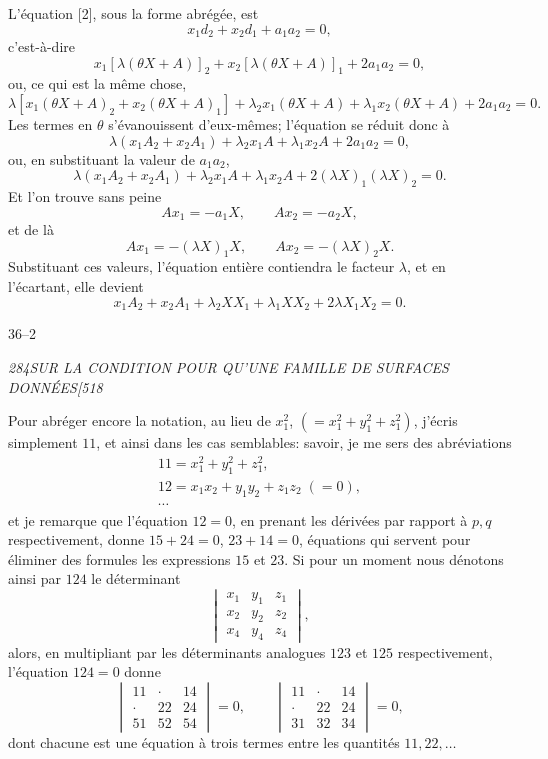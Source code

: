\documentclass[11pt]{article}
\newcommand{\phead}[3]{\noindent\textit{#1\hfill #2\hfill #3}\par\medskip}
\begin{document}
L'\'equation [2], sous la forme abr\'eg\'ee, est
\[
x_1d_2+x_2d_1+a_1a_2=0,
\]
c'est-\`a-dire
\[
x_1[\lambda(\theta X+A)]_2+x_2[\lambda(\theta X+A)]_1+2a_1a_2=0,
\]
ou, ce qui est la m\^eme chose,
\[
\lambda[x_1(\theta X+A)_2+x_2(\theta X+A)_1]
+\lambda_2x_1(\theta X+A)+\lambda_1x_2(\theta X+A)+2a_1a_2=0.
\]
Les termes en $\theta$ s'\'evanouissent d'eux-m\^emes; l'\'equation se r\'eduit donc \`a
\[
\lambda(x_1A_2+x_2A_1)+\lambda_2x_1A+\lambda_1x_2A+2a_1a_2=0,
\]
ou, en substituant la valeur de $a_1a_2$,
\[
\lambda(x_1A_2+x_2A_1)+\lambda_2x_1A+\lambda_1x_2A+2(\lambda X)_1(\lambda X)_2=0.
\]
Et l'on trouve sans peine
\[
Ax_1=-a_1X,\qquad Ax_2=-a_2X,
\]
et de l\`a
\[
A x_1=-(\lambda X)_1X,\qquad A x_2=-(\lambda X)_2X.
\]
Substituant ces valeurs, l'\'equation enti\`ere contiendra le facteur $\lambda$, et en
l'\'ecartant, elle devient
\[
x_1A_2+x_2A_1+\lambda_2XX_1+\lambda_1XX_2+2\lambda X_1X_2=0.
\]

\hfill 36--2
\clearpage

\phead{284}{SUR LA CONDITION POUR QU'UNE FAMILLE DE SURFACES DONN\'EES}{[518}

Pour abr\'eger encore la notation, au lieu de $x_1^2$, $(=x_1^2+y_1^2+z_1^2)$,
j'\'ecris simplement $11$, et ainsi dans les cas semblables: savoir, je me sers des
abr\'eviations
\[
\begin{gathered}
11=x_1^2+y_1^2+z_1^2,\\
12=x_1x_2+y_1y_2+z_1z_2\;(=0),\\
\cdots
\end{gathered}
\]
et je remarque que l'\'equation $12=0$, en prenant les d\'eriv\'ees par rapport \`a
$p,q$ respectivement, donne $15+24=0$, $23+14=0$, \'equations qui servent pour
\'eliminer des formules les expressions $15$ et $23$. Si pour un moment nous
d\'enotons ainsi par $124$ le d\'eterminant
\[
\begin{vmatrix}
x_1&y_1&z_1\\
x_2&y_2&z_2\\
x_4&y_4&z_4
\end{vmatrix},
\]
alors, en multipliant par les d\'eterminants analogues $123$ et $125$
respectivement, l'\'equation $124=0$ donne
\[
\begin{vmatrix}
11&\cdot&14\\
\cdot&22&24\\
51&52&54
\end{vmatrix}=0,\qquad
\begin{vmatrix}
11&\cdot&14\\
\cdot&22&24\\
31&32&34
\end{vmatrix}=0,
\]
dont chacune est une \'equation \`a trois termes entre les quantit\'es
$11,22,\ldots$
\end{document}
